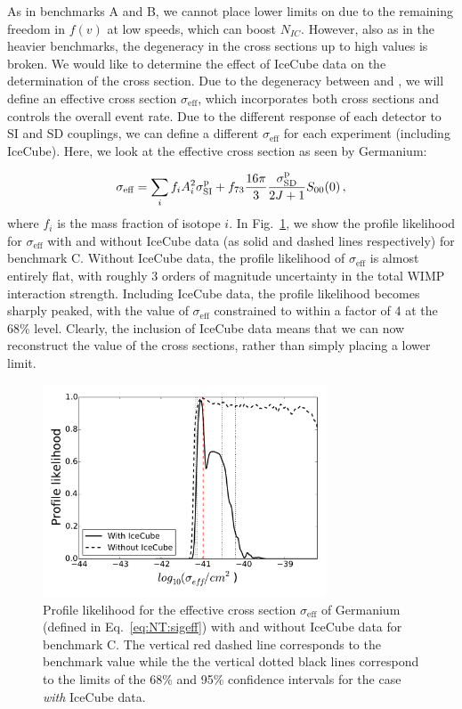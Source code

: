 As in benchmarks A and B, we cannot place lower limits on \sigmapsd due to the remaining freedom in $f(v)$ at low speeds, which can boost $N_{IC}$. However, also as in the heavier benchmarks, the degeneracy in the cross sections up to high values is broken. We would like to determine the effect of IceCube data on the determination of the cross section. Due to the degeneracy between \sigmapsi and \sigmapsd, we will define an effective cross section $\sigma_\textrm{eff}$, which incorporates both cross sections and controls the overall event rate. Due to the different response of each detector to SI and SD couplings, we can define a different $\sigma_\textrm{eff}$ for each experiment (including IceCube). Here, we look at the effective cross section as seen by Germanium:

\begin{equation}
\label{eq:NT:sigeff}
\sigma_\textrm{eff} = \sum_{i} f_i A_i^2 \sigmapsi + f_{73} \frac{16\pi}{3} \frac{\sigmapsd}{2J+1} S_{00}(0)\,,
\end{equation}
where $f_i$ is the mass fraction of isotope $i$. In Fig.~\ref{fig:NT:sigeff}, we show the profile likelihood for $\sigma_\textrm{eff}$ with and without IceCube data (as solid and dashed lines respectively) for benchmark C. Without IceCube data, the profile likelihood of $\sigma_\textrm{eff}$ is almost entirely flat, with roughly 3 orders of magnitude uncertainty in the total WIMP interaction strength. Including IceCube data, the profile likelihood becomes sharply peaked, with the value of $\sigma_\textrm{eff}$ constrained to within a factor of 4 at the 68\% level. Clearly, the inclusion of IceCube data means that we can now reconstruct the value of the cross sections, rather than simply placing a lower limit.

\begin{figure}[!ht]
  \centering
  \includegraphics[width=0.75\textwidth]{NT/final018-sigeff.pdf}
\caption[Profile likelihood for the effective cross section $\sigma_\textrm{eff}$ for a Germanium experiment]{Profile likelihood for the effective cross section $\sigma_\textrm{eff}$ of Germanium (defined in Eq.~\ref{eq:NT:sigeff}) with and without IceCube data for benchmark C. The vertical red dashed line corresponds to the benchmark value while the the vertical dotted black lines correspond to the limits of the 68\% and 95\% confidence intervals for the case \textit{with} IceCube data.}
\label{fig:NT:sigeff}
\end{figure}


